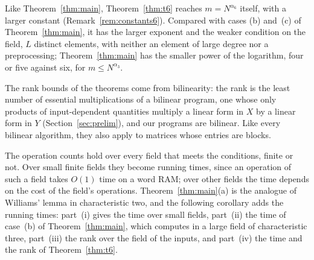 \documentclass[11pt]{article}
\theoremstyle{definition}
\theoremstyle{remark}
\begin{document}
Like Theorem~\ref{thm:main}, Theorem~\ref{thm:t6} reaches $m=N^{\alpha_6}$ itself, with a larger constant (Remark~\ref{rem:constants6}). Compared with cases (b) and~(c) of Theorem~\ref{thm:main}, it has the larger exponent and the weaker condition on the field, $L$ distinct elements, with neither an element of large degree nor a preprocessing; Theorem~\ref{thm:main} has the smaller power of the logarithm, four or five against six, for $m\le N^{\alpha_3}$.

The rank bounds of the theorems come from bilinearity: the rank is the least number of essential multiplications of a bilinear program, one whose only products of input-dependent quantities multiply a linear form in $X$ by a linear form in $Y$ (Section~\ref{sec:prelim}), and our programs are bilinear. Like every bilinear algorithm, they also apply to matrices whose entries are blocks.

The operation counts hold over every field that meets the conditions, finite or not. Over small finite fields they become running times, since an operation of such a field takes $O(1)$ time on a word RAM; over other fields the time depends on the cost of the field's operations. Theorem~\ref{thm:main}(a) is the analogue of Williams' lemma in characteristic two, and the following corollary adds the running times: part~(i) gives the time over small fields, part~(ii) the time of case~(b) of Theorem~\ref{thm:main}, which computes in a large field of characteristic three, part~(iii) the rank over the field of the inputs, and part~(iv) the time and the rank of Theorem~\ref{thm:t6}.
\end{document}
